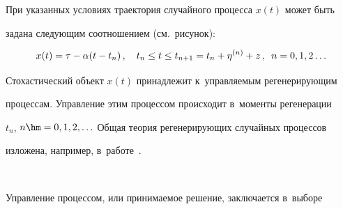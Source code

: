   

  При указанных условиях траектория случайного процесса $x(t)$ может быть 

задана следующим соотношением (см.\ рисунок):

  $$

  x(t)=\tau-\alpha(t-t_n)\,,\quad

  t_n\leq t\leq t_{n+1}=t_n+\eta^{(n)}+z\,,\enskip n=0,1,2\ldots

  $$

  

  Стохастический объект $x(t)$ принадлежит к~управляемым регенерирующим 

процессам. Управление этим процессом происходит в~моменты регенерации 

$t_n$, $n\hm=0,1,2,\ldots$ Общая теория регенерирующих случайных процессов 

изложена, например, в~работе~\cite{14-sh}.



\pagebreak



\

\vspace*{-12pt}




  



  

  Управление процессом, или принимаемое решение, заключается в~выборе 

